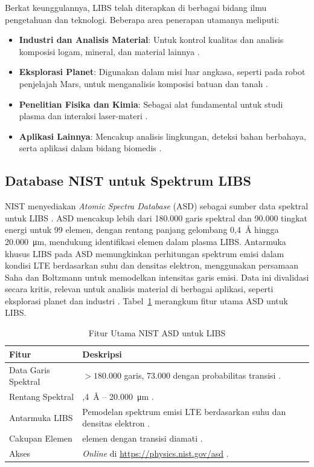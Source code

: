 Berkat keunggulannya, LIBS telah diterapkan di berbagai bidang ilmu pengetahuan dan teknologi. Beberapa area penerapan utamanya meliputi:
\begin{itemize}
    \item \textbf{Industri dan Analisis Material}: Untuk kontrol kualitas dan analisis komposisi logam, mineral, dan material lainnya \cite{kramida2022nist}.
    \item \textbf{Eksplorasi Planet}: Digunakan dalam misi luar angkasa, seperti pada robot penjelajah Mars, untuk menganalisis komposisi batuan dan tanah \cite{kramida2022nist}.
    \item \textbf{Penelitian Fisika dan Kimia}: Sebagai alat fundamental untuk studi plasma dan interaksi laser-materi \cite{miziolek2006libs}.
    \item \textbf{Aplikasi Lainnya}: Mencakup analisis lingkungan, deteksi bahan berbahaya, serta aplikasi dalam bidang biomedis \cite{porizka2018review}.
\end{itemize}
\subsection{Database NIST untuk Spektrum LIBS}

NIST menyediakan \textit{Atomic Spectra Database} (ASD) sebagai sumber data spektral untuk LIBS \citep{Kramida2023}. ASD mencakup lebih dari 180.000 garis spektral dan 90.000 tingkat energi untuk 99 elemen, dengan rentang panjang gelombang 0,4~\AA{} hingga 20.000~\si{\micro\meter}, mendukung identifikasi elemen dalam plasma LIBS. Antarmuka khusus LIBS pada ASD memungkinkan perhitungan spektrum emisi dalam kondisi LTE berdasarkan suhu dan densitas elektron, menggunakan persamaan Saha dan Boltzmann untuk memodelkan intensitas garis emisi. Data ini divalidasi secara kritis, relevan untuk analisis material di berbagai aplikasi, seperti eksplorasi planet dan industri \citep{Kramida2022}. Tabel~\ref{tab:nist_features} merangkum fitur utama ASD untuk LIBS.

\begin{table}[H]
\centering
\caption{Fitur Utama NIST ASD untuk LIBS}
\label{tab:nist_features}
\begin{tabularx}{\textwidth}{>{\raggedright\arraybackslash}X>{\raggedright\arraybackslash}X}
\toprule
\textbf{Fitur} & \textbf{Deskripsi} \\
\midrule
Data Garis Spektral & $>180.000$ garis, 73.000 dengan probabilitas transisi \citep{Kramida2023}. \\
Rentang Spektral & 0,4~\AA{} -- 20.000~\si{\micro\meter} \citep{Kramida2023}. \\
Antarmuka LIBS & Pemodelan spektrum emisi LTE berdasarkan suhu dan densitas elektron \citep{Kramida2023}. \\
Cakupan Elemen & 99 elemen dengan transisi diamati \citep{Kramida2023}. \\
Akses & \textit{Online} di \url{https://physics.nist.gov/asd} \citep{Kramida2023}. \\
\bottomrule
\end{tabularx}
\end{table}

